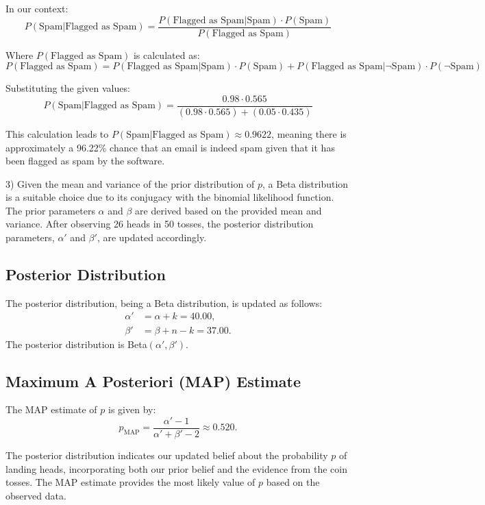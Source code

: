 \documentclass[12pt]{article}
\begin{document}
In our context:
\[P(\text{Spam}|\text{Flagged as Spam}) = \frac{P(\text{Flagged as Spam}|\text{Spam}) \cdot P(\text{Spam})}{P(\text{Flagged as Spam})}\]

Where $P(\text{Flagged as Spam})$ is calculated as:
\[P(\text{Flagged as Spam}) = P(\text{Flagged as Spam}|\text{Spam}) \cdot P(\text{Spam}) + P(\text{Flagged as Spam}|\neg\text{Spam}) \cdot P(\neg\text{Spam})\]

Substituting the given values:
\[P(\text{Spam}|\text{Flagged as Spam}) = \frac{0.98 \cdot 0.565}{(0.98 \cdot 0.565) + (0.05 \cdot 0.435)}\]

This calculation leads to $P(\text{Spam}|\text{Flagged as Spam}) \approx 0.9622$, meaning there is approximately a 96.22\% chance that an email is indeed spam given that it has been flagged as spam by the software.

3)
Given the mean and variance of the prior distribution of $p$, a Beta distribution is a suitable choice due to its conjugacy with the binomial likelihood function. The prior parameters $\alpha$ and $\beta$ are derived based on the provided mean and variance. After observing 26 heads in 50 tosses, the posterior distribution parameters, $\alpha'$ and $\beta'$, are updated accordingly.

\subsection{Posterior Distribution}
The posterior distribution, being a Beta distribution, is updated as follows:
\begin{align*}
    \alpha' &= \alpha + k = 40.00, \\
    \beta' &= \beta + n - k = 37.00.
\end{align*}
The posterior distribution is Beta$(\alpha', \beta')$.


\subsection{Maximum A Posteriori (MAP) Estimate}
The MAP estimate of $p$ is given by:
\begin{equation*}
    p_{\text{MAP}} = \frac{\alpha' - 1}{\alpha' + \beta' - 2} \approx 0.520.
\end{equation*}

The posterior distribution indicates our updated belief about the probability $p$ of landing heads, incorporating both our prior belief and the evidence from the coin tosses. The MAP estimate provides the most likely value of $p$ based on the observed data.
\end{document}
